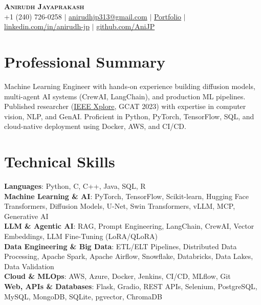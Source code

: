 \documentclass[letterpaper,10.5pt]{article}
\begin{document}
\begin{center}
    \textbf{\Huge \scshape Anirudh Jayaprakash} \\ \vspace{2pt}
    \small +1 (240) 726-0258 $|$ \href{mailto:anirudhjp313@gmail.com}{anirudhjp313@gmail.com} $|$
    \href{https://anijp.github.io}{Portfolio} $|$
    \href{https://linkedin.com/in/anirudh-jp}{linkedin.com/in/anirudh-jp} $|$
    \href{https://github.com/AniJP}{github.com/AniJP} \\ \vspace{2pt}
\end{center}

\section{Professional Summary}
\small{Machine Learning Engineer with hands-on experience building diffusion models, multi-agent AI systems (CrewAI, LangChain), and production ML pipelines. Published researcher (\href{https://ieeexplore.ieee.org/document/10353415}{IEEE Xplore}, GCAT 2023) with expertise in computer vision, NLP, and GenAI. Proficient in Python, PyTorch, TensorFlow, SQL, and cloud-native deployment using Docker, AWS, and CI/CD.}
\vspace{-6pt}

\section{Technical Skills}
 \begin{itemize}[leftmargin=0.15in, label={}]
    \small{\item{
     \textbf{Languages}{: Python, C, C++, Java, SQL, R} \\
     \textbf{Machine Learning \& AI}{: PyTorch, TensorFlow, Scikit-learn, Hugging Face Transformers, Diffusion Models, U-Net, Swin Transformers, vLLM, MCP, Generative AI} \\
     \textbf{LLM \& Agentic AI}{: RAG, Prompt Engineering, LangChain, CrewAI, Vector Embeddings, LLM Fine-Tuning (LoRA/QLoRA)} \\
     \textbf{Data Engineering \& Big Data}{: ETL/ELT Pipelines, Distributed Data Processing, Apache Spark, Apache Airflow, Snowflake, Databricks, Data Lakes, Data Validation} \\
     \textbf{Cloud \& MLOps}{: AWS, Azure, Docker, Jenkins, CI/CD, MLflow, Git} \\
     \textbf{Web, APIs \& Databases}{: Flask, Gradio, REST APIs, Selenium, PostgreSQL, MySQL, MongoDB, SQLite, pgvector, ChromaDB}
    }}
 \end{itemize}
\vspace{-6pt}
\end{document}
